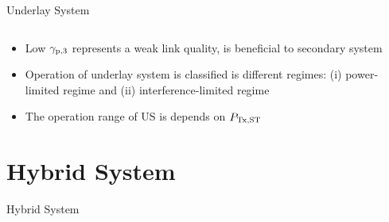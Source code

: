 \documentclass[16pt]{beamer}
\newif\ifhybrid
\begin{document}
\begin{frame}[t]{Underlay System}
\begin{columns}
\begin{column}{0.55\columnwidth}
\begin{center}
{{	
			}
                }
		\end{center}
		\end{column}
	\end{columns}
	{	
		\begin{block}{}%
		\begin{itemize}
			\item Low ${\gamma}_{\text{p,3}}$ represents a weak link quality, is beneficial to secondary system 
			
			\item Operation of underlay system is classified is different regimes: (i) power-limited regime and (ii) interference-limited regime
			\item The operation range of US is depends on $P_{\text{Tx,ST}}$ 
		\end{itemize}		
		\end{block}
	}
\end{frame}
\fi

\ifhybrid
\section{Hybrid System}
\begin{frame}[c]{}
\begin{center}
Hybrid System
\end{center}
\end{frame}
\end{document}
